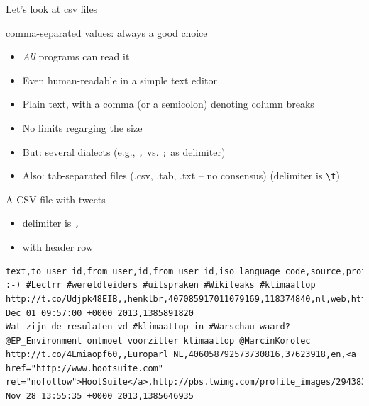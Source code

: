 \documentclass[compress]{beamer}
\begin{document}
\begin{frame}{Let's look at csv files}
	\begin{block}{comma-separated values: always a good choice}
		\begin{itemize}
			\item \emph{All} programs can read it
			\item Even human-readable in a simple text editor
			\item Plain text, with a comma (or a semicolon) denoting column breaks
			\item No limits regarging the size
			\item But: several dialects (e.g., \texttt{,} vs. \texttt{;} as delimiter)
			\item Also: tab-separated files (.csv, .tab, .txt -- no consensus) (delimiter is \texttt{\textbackslash t})
		\end{itemize}
	\end{block}
\end{frame}


\begin{frame}[fragile]{A CSV-file with tweets}
	\begin{itemize}
		\item delimiter is \texttt{,}
		\item with  header row
	\end{itemize}
	\begin{lstlisting}
text,to_user_id,from_user,id,from_user_id,iso_language_code,source,profile_image_url,geo_type,geo_coordinates_0,geo_coordinates_1,created_at,time
:-) #Lectrr #wereldleiders #uitspraken #Wikileaks #klimaattop http://t.co/Udjpk48EIB,,henklbr,407085917011079169,118374840,nl,web,http://pbs.twimg.com/profile_images/378800000673845195/b47785b1595e6a1c63b93e463f3d0ccc_normal.jpeg,,0,0,Sun Dec 01 09:57:00 +0000 2013,1385891820
Wat zijn de resulaten vd #klimaattop in #Warschau waard? @EP_Environment ontmoet voorzitter klimaattop @MarcinKorolec http://t.co/4Lmiaopf60,,Europarl_NL,406058792573730816,37623918,en,<a href="http://www.hootsuite.com" rel="nofollow">HootSuite</a>,http://pbs.twimg.com/profile_images/2943831271/b6631b23a86502fae808ca3efde23d0d_normal.png,,0,0,Thu Nov 28 13:55:35 +0000 2013,1385646935
\end{lstlisting}
\end{frame}
\end{document}

